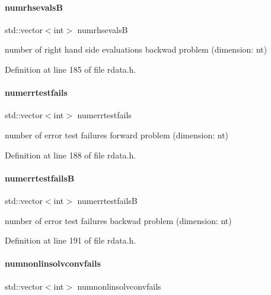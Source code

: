 \paragraph{\texorpdfstring{numrhsevalsB}{numrhsevalsB}}
{\footnotesize\ttfamily std\+::vector$<$int$>$ numrhsevalsB}

number of right hand side evaluations backwad problem (dimension\+: nt) 

Definition at line 185 of file rdata.\+h.

\mbox{\label{classamici_1_1_return_data_aea0bfe23fb5971a5348a3d017a859488}} 
\paragraph{\texorpdfstring{numerrtestfails}{numerrtestfails}}
{\footnotesize\ttfamily std\+::vector$<$int$>$ numerrtestfails}

number of error test failures forward problem (dimension\+: nt) 

Definition at line 188 of file rdata.\+h.

\mbox{\label{classamici_1_1_return_data_a894f4cf4dbdd38dda12c5730fb04482d}} 
\paragraph{\texorpdfstring{numerrtestfailsB}{numerrtestfailsB}}
{\footnotesize\ttfamily std\+::vector$<$int$>$ numerrtestfailsB}

number of error test failures backwad problem (dimension\+: nt) 

Definition at line 191 of file rdata.\+h.

\mbox{\label{classamici_1_1_return_data_a67818adc34db21fb3d78731c0e60462a}} 
\paragraph{\texorpdfstring{numnonlinsolvconvfails}{numnonlinsolvconvfails}}
{\footnotesize\ttfamily std\+::vector$<$int$>$ numnonlinsolvconvfails}

